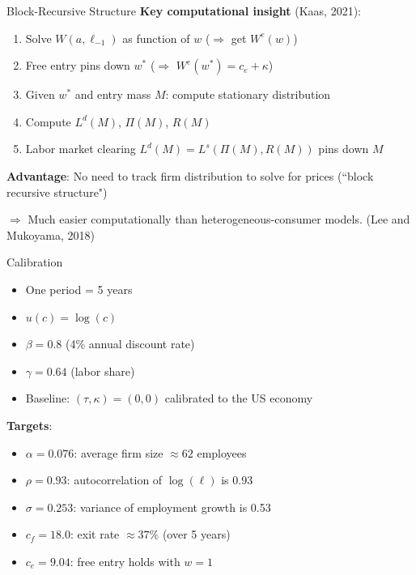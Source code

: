 \documentclass[blue]{beamer}
\begin{document}
\begin{frame}{Block-Recursive Structure}
	\textbf{Key computational insight} (Kaas, 2021):
	
	\bigskip
	\begin{enumerate}
		\item Solve $W(a, \ell_{-1})$ as function of $w$ ($\Rightarrow$ get $W^e(w)$)
		\item Free entry pins down $w^*$ ($\Rightarrow$ $W^e(w^*) = c_e + \kappa$)
		\item Given $w^*$ and entry mass $M$: compute stationary distribution
		\item Compute $L^d(M)$, $\Pi(M)$, $R(M)$
		\item Labor market clearing $L^d(M) = L^s(\Pi(M), R(M))$ pins down $M$
	\end{enumerate}
	
	\bigskip
	\textbf{Advantage}: No need to track firm distribution to solve for prices (``block recursive structure")
	
	\medskip
	$\Rightarrow$ Much easier computationally than heterogeneous-consumer models. (Lee and Mukoyama, 2018)
\end{frame}

\begin{frame}{Calibration}
	\begin{itemize}
		\item One period = 5 years
		\item $u(c) = \log(c)$
		\item $\beta = 0.8$ (4\% annual discount rate)
		\item $\gamma = 0.64$ (labor share)
		\item Baseline: $(\tau, \kappa) = (0, 0)$ calibrated to the US economy
	\end{itemize}
	
	\bigskip
	\textbf{Targets}:
	\begin{itemize}
		\item $\alpha = 0.076$: average firm size $\approx 62$ employees
		\item $\rho = 0.93$: autocorrelation of $\log(\ell)$ is 0.93
		\item $\sigma = 0.253$: variance of employment growth is 0.53
		\item $c_f = 18.0$: exit rate $\approx 37\%$ (over 5 years)
		\item $c_e = 9.04$: free entry holds with $w = 1$
	\end{itemize}
\end{frame}
\end{document}
